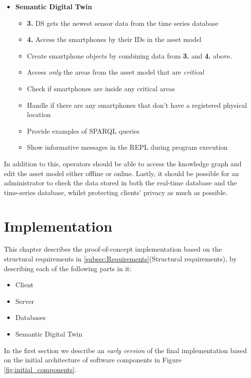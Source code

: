 \documentclass{article}
\begin{document}
\begin{itemize}
\begin{itemize}
    \end{itemize}
    \item \textbf{Semantic Digital Twin}
    \begin{itemize} 
        \item \textbf{3.} DS gets the newest sensor data from the time series database
        \item \textbf{4.} Access the smartphones by their IDs in the asset model
        \item Create smartphone objects by combining data from \textbf{3.} and \textbf{4.} above. 
        \item Access \emph{only} the areas from the asset model that are \emph{critical}
        \item Check if smartphones are inside any critical areas
        \item Handle if there are any smartphones that don't have a registered physical location
        \item Provide examples of SPARQL queries
        \item Show informative messages in the REPL during program execution
    \end{itemize}
\end{itemize}

In addition to this, operators should be able to access the knowledge graph and edit the asset model either offline or online. Lastly, it should be possible for an administrator to check the data stored in both the real-time database and the time-series database, whilst protecting clients' privacy as much as possible.

\newpage


\section{Implementation}\label{sec:Implementation}
This chapter describes the proof-of-concept implementation based on the structural requirements in \ref{subsec:Requirements}(Structural requirements), by describing each of the following parts in it:
\begin{itemize}
    \item Client
    \item Server
    \item Databases
    \item Semantic Digital Twin
\end{itemize}
In the first section we describe an \emph{early version} of the final implementation based on the initial architecture of software components in Figure \ref{fig:initial_components}. 
\end{document}
